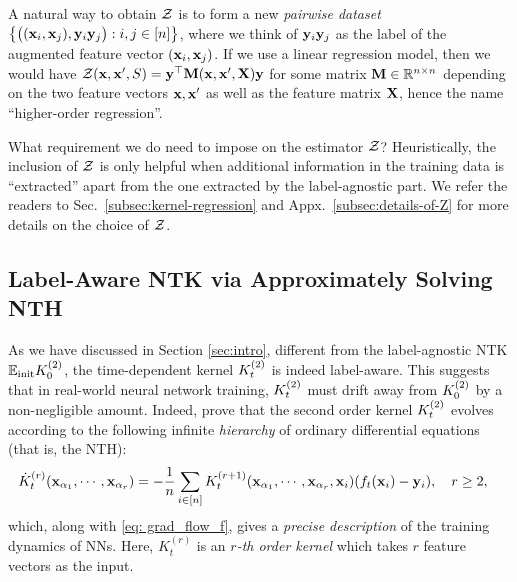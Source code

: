 A natural way to obtain ${\mathcal{Z}}$ is to form a new \emph{pairwise dataset} $\bigl\{\bigl( ({\mathbf{x}}_i, {\mathbf{x}}_j), {\mathbf{y}}_i{\mathbf{y}}_j\bigr): i, j\in[n]\bigr\}$, where we think of ${\mathbf{y}}_i{\mathbf{y}}_j$ as the label of the augmented feature vector $({\mathbf{x}}_i, {\mathbf{x}}_j)$. If we use a linear regression model, then we would have ${\mathcal{Z}}({\mathbf{x}}, {\mathbf{x}}', S) = {\mathbf{y}}^\top {\mathbf{M}}({\mathbf{x}}, {\mathbf{x}}', {\mathbf{X}}) {\mathbf{y}}$ for some matrix ${\mathbf{M}}\in \mathbb{R}^{n\times n}$ depending on the two feature vectors ${\mathbf{x}}, {\mathbf{x}}'$ as well as the feature matrix ${\mathbf{X}}$, hence the name ``higher-order regression''. 

What requirement we do need to impose on the estimator ${\mathcal{Z}}$? Heuristically, the inclusion of ${\mathcal{Z}}$ is only helpful when additional information in the training data is ``extracted'' apart from the one extracted by the label-agnostic part. We refer the readers to Sec.~\ref{subsec:kernel-regression} and Appx.~\ref{subsec:details-of-Z} for more details on the choice of ${\mathcal{Z}}$.



\subsection{Label-Aware NTK via Approximately Solving NTH}
As we have discussed in Section \ref{sec:intro}, different from the label-agnostic NTK ${\mathbb{E}}_{\textnormal{init}} {K}^{(2)}_0$, the time-dependent kernel ${K}^{(2)}_t$ is indeed label-aware. This suggests that in real-world neural network training, ${K}^{(2)}_t$ must drift away from ${K}^{(2)}_0$ by a non-negligible amount. Indeed, \cite{huang2019dynamics} prove that the second order kernel ${K}^{(2)}_t$ evolves according to the following infinite \emph{hierarchy} of ordinary differential equations (that is, the NTH): 
\begin{align}
	\label{eq: nth}
	\dot{K}^{(r)}_t({\mathbf{x}}_{\alpha_1}, \cdots, {\mathbf{x}}_{\alpha_r}) & = -\frac{1}{n} \sum_{i\in[n]} K^{(r+1)}_t({\mathbf{x}}_{\alpha_1}, \cdots, {\mathbf{x}}_{\alpha_r}, {\mathbf{x}}_i)(f_t({\mathbf{x}}_i) - {\mathbf{y}}_i), \ \ \ r\geq 2,
\end{align}
which, along with \eqref{eq: grad_flow_f}, gives a \emph{precise description} of the training dynamics of NNs.
Here, $K_t^{(r)}$ is an \emph{$r$-th order kernel} which takes $r$ feature vectors as the input. 

